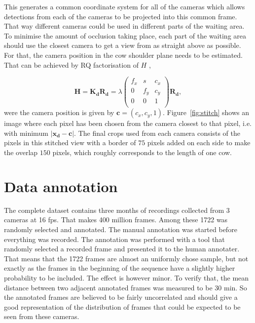 \documentclass{cta-author}
\begin{document}
This generates a common coordinate system for all of the cameras which allows detections from each of the 
cameras to be projected into this common frame. That way different cameras could be used in different parts 
of the waiting area. To minimise the amount of occlusion taking place, each part of the waiting area should 
use the closest camera to get a view from as straight above as possible. For that, the camera position in the 
cow shoulder plane needs to be estimated. That can be achieved by RQ factorisation of $H$ \cite{Hartley2004}, 

\begin{equation}
\bm H = \bm {K_d} \bm {R_d} = 
    \lambda
	\left(
	\begin{array}{ccc}
		f_x & s & c_x  \\
		0 & f_y & c_y  \\
		0 & 0 & 1  \\
	\end{array}
	\right)
	\bm {R_d} ,
\end{equation}
were the camera position is given by $\bm c = \left(c_x, c_y, 1\right)$. Figure~\ref{fig:stitch} shows an 
image where each pixel has been chosen from the camera closest to that pixel, i.e. with  minimum $\left| \bm 
{x_d} - \bm c \right|$. The final crops used from each camera consists of the pixels in this stitched view 
with a border of $75$ pixels added on each side to make the overlap $150$ pixels, which roughly corresponds 
to the length of one cow.


\section{Data annotation}

The complete dataset contains three months of recordings collected from 3 cameras at 16 fps. That makes 400 
million frames. Among these 1722 was randomly selected and annotated. The manual annotation was started 
before everything was recorded. The annotation was performed with a tool that randomly selected a recorded 
frame and presented it to the human annotater. That means that the 1722 frames are almost an uniformly chose 
sample, but not exactly as the frames in the beginning of the sequence have a slightly higher probability to 
be included. The effect is however minor. To verify that, 
the mean distance between two adjacent annotated frames was measured to be 30 min. So the annotated frames are 
believed to be fairly uncorrelated and should give a good representation of the distribution of frames that 
could be expected to be seen from these cameras.
\end{document}

